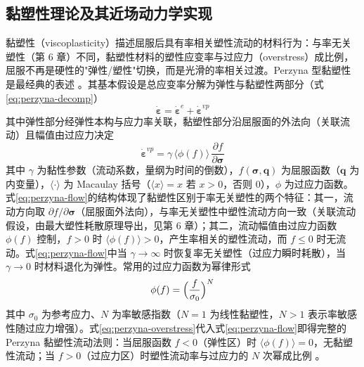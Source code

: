 \subsection{黏塑性理论及其近场动力学实现}\label{sec:viscoplastic}

黏塑性（viscoplasticity）描述屈服后具有率相关塑性流动的材料行为：与率无关塑性（第 6 章）不同，黏塑性材料的塑性应变率与过应力（overstress）成比例，屈服不再是硬性的"弹性/塑性"切换，而是光滑的率相关过渡。Perzyna 型黏塑性是最经典的表述 \cite{Perzyna1966}。其基本假设是总应变率分解为弹性与黏塑性两部分（式\eqref{eq:perzyna-decomp}）
\begin{equation}
  \dot{\boldsymbol{\varepsilon}}=\dot{\boldsymbol{\varepsilon}}^{e}+\dot{\boldsymbol{\varepsilon}}^{vp}
  \label{eq:perzyna-decomp}
\end{equation}
其中弹性部分经弹性本构与应力率关联，黏塑性部分沿屈服面的外法向（关联流动）且幅值由过应力决定
\begin{equation}
  \dot{\boldsymbol{\varepsilon}}^{vp}
  =\gamma\,\langle\phi(f)\rangle\,\frac{\partial f}{\partial\boldsymbol{\sigma}}
  \label{eq:perzyna-flow}
\end{equation}
其中 $\gamma$ 为黏性参数（流动系数，量纲为时间的倒数），$f(\boldsymbol{\sigma},\boldsymbol{q})$ 为屈服函数（$\boldsymbol{q}$ 为内变量），$\langle\cdot\rangle$ 为 Macaulay 括号（$\langle x\rangle=x$ 若 $x>0$，否则 $0$），$\phi$ 为过应力函数。式\eqref{eq:perzyna-flow}的结构体现了黏塑性区别于率无关塑性的两个特征：其一，流动方向取 $\partial f/\partial\boldsymbol{\sigma}$（屈服面外法向），与率无关塑性中塑性流动方向一致（关联流动假设，由最大塑性耗散原理导出，见第 6 章）；其二，流动幅值由过应力函数 $\phi(f)$ 控制，$f>0$ 时 $\langle\phi(f)\rangle>0$，产生率相关的塑性流动，而 $f\le0$ 时无流动。式\eqref{eq:perzyna-flow}中当 $\gamma\to\infty$ 时恢复率无关塑性（过应力瞬时耗散），当 $\gamma\to0$ 时材料退化为弹性。常用的过应力函数为幂律形式
\begin{equation}
  \phi(f)=\Bigl(\frac{f}{\sigma_{0}}\Bigr)^{N}
  \label{eq:perzyna-overstress}
\end{equation}
其中 $\sigma_{0}$ 为参考应力、$N$ 为率敏感指数（$N=1$ 为线性黏塑性，$N>1$ 表示率敏感性随过应力增强）\cite{Perzyna1966}。式\eqref{eq:perzyna-overstress}代入式\eqref{eq:perzyna-flow}即得完整的 Perzyna 黏塑性流动法则：当屈服函数 $f<0$（弹性区）时 $\langle\phi(f)\rangle=0$，无黏塑性流动；当 $f>0$（过应力区）时塑性流动率与过应力的 $N$ 次幂成比例 \cite{Perzyna1966}。

